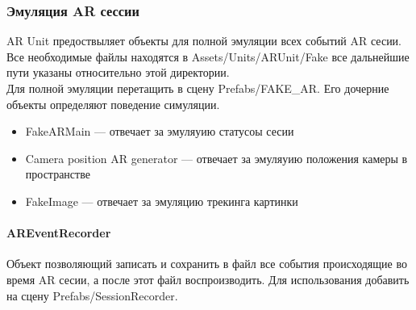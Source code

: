 \documentclass[a4paper, 11pt, titlepage]{article}
\begin{document}
      \subsubsection{Эмуляция AR сессии}
        AR Unit предоствыляет объекты для полной эмуляции всех событий AR сесии.\\
        Все необходимые файлы находятся в Assets/Units/ARUnit/Fake все дальнейшие пути указаны относительно этой директории.\\
        Для полной эмуляции перетащить в сцену Prefabs/FAKE\_AR. Его дочерние объекты определяют поведение симуляции.
        \begin{itemize}
          \item FakeARMain --- отвечает за эмуляуию статусоы сесии
          \item Camera position AR generator --- отвечает за эмуляуию положения камеры в пространстве
          \item FakeImage --- отвечает за эмуляцию трекинга картинки
        \end{itemize} 

      \paragraph{AREventRecorder}
        Объект позволяющий записать и сохранить в файл все события происходящие во время AR сесии, а после 
        этот файл воспроизводить.
        Для использования добавить на сцену Prefabs/SessionRecorder.
\end{document}
